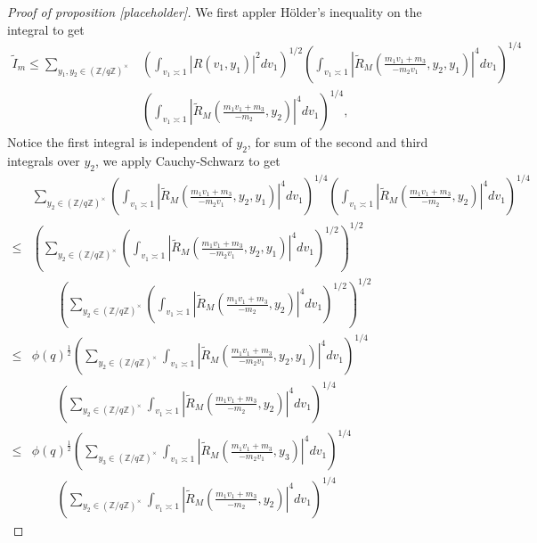 \begin{proof}[{Proof of proposition [placeholder]}]
    We first appler H\"older's inequality on the integral to get 
    \begin{align*}
        \tilde{I}_m \leq  \sum_{y_1,y_2\in (\mathbb{Z}/q\mathbb{Z})^\times}& \left(\int_{v_1\asymp 1} 
        \left|R\left(v_1,y_1\right)\right|^2dv_1\right)^{1/2} \left(\int_{v_1\asymp 1} \left|\tilde{R}_M\left(\frac{m_1v_1+m_3}{-m_2v_1},y_2,y_1\right)\right|^4 dv_1\right)^{1/4} \\& \left(\int_{v_1\asymp 1} 
       \left| \tilde{R}_M(\frac{m_1v_1+m_3}{-m_2},y_2)\right|^{4} dv_1\right)^{1/4},
    \end{align*}
    Notice the first integral is independent of $y_2$, for sum of the second and third integrals over $y_2$, we apply Cauchy-Schwarz to get\begin{align*}
        &\sum_{y_2\in (\mathbb{Z}/q\mathbb{Z})^\times}\left(\int_{v_1\asymp 1} \left|\tilde{R}_M\left(\frac{m_1v_1+m_3}{-m_2v_1},y_2,y_1\right)\right|^4 dv_1\right)^{1/4} \left(\int_{v_1\asymp 1} 
       \left| \tilde{R}_M(\frac{m_1v_1+m_3}{-m_2},y_2)\right|^{4} dv_1\right)^{1/4}\\
       \leq& \left(\sum_{y_2\in (\mathbb{Z}/q\mathbb{Z})^\times}\left(\int_{v_1\asymp 1} \left|\tilde{R}_M\left(\frac{m_1v_1+m_3}{-m_2v_1},y_2,y_1\right)\right|^4 dv_1\right)^{1/2}\right)^{1/2}\\ &\quad \quad
       \left(
       \sum_{y_2\in (\mathbb{Z}/q\mathbb{Z})^\times} \left(\int_{v_1\asymp 1}
       \left| \tilde{R}_M(\frac{m_1v_1+m_3}{-m_2},y_2)\right|^{4} dv_1 \right)^{1/2}\right)^{1/2}
       \\ 
       \leq&  \phi(q)^{\frac{1}{2}} \left(\sum_{y_2\in (\mathbb{Z}/q\mathbb{Z})^\times}\int_{v_1\asymp 1} \left|\tilde{R}_M\left(\frac{m_1v_1+m_3}{-m_2v_1},y_2,y_1\right)\right|^4 dv_1\right)^{1/4}\\ &\quad \quad
       \left(
       \sum_{y_2\in (\mathbb{Z}/q\mathbb{Z})^\times} \int_{v_1\asymp 1}
       \left| \tilde{R}_M(\frac{m_1v_1+m_3}{-m_2},y_2)\right|^{4} dv_1\right)^{1/4} \\
       \leq&  \phi(q)^{\frac{1}{2}} \left(\sum_{y_3\in (\mathbb{Z}/q\mathbb{Z})^\times}\int_{v_1\asymp 1} \left|\tilde{R}_M\left(\frac{m_1v_1+m_3}{-m_2v_1},y_3\right)\right|^4 dv_1\right)^{1/4}\\ &\quad \quad
       \left(
       \sum_{y_2\in (\mathbb{Z}/q\mathbb{Z})^\times} \int_{v_1\asymp 1}
       \left| \tilde{R}_M(\frac{m_1v_1+m_3}{-m_2},y_2)\right|^{4} dv_1\right)^{1/4}

\end{align*}
\end{proof}

